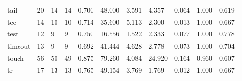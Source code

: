 \begin{longtable}{lp{1.8cm}p{1.8cm}p{1.8cm}p{1.8cm}p{1.8cm}p{1.8cm}p{1.8cm}p{1.8cm}p{1.8cm}p{1.8cm}}
tail      &                           20 &                 14 &                                14 &                                      0.700 &                                 48.000 &                                        3.591 &                             4.357 &                                   0.064 &                              1.000 &                                              0.619 \\
tee       &                           14 &                 10 &                                10 &                                      0.714 &                                 35.600 &                                        5.113 &                             2.300 &                                   0.013 &                              1.000 &                                              0.667 \\
test      &                           12 &                  9 &                                 9 &                                      0.750 &                                 16.556 &                                        1.522 &                             2.333 &                                   0.077 &                              1.000 &                                              0.778 \\
timeout   &                           13 &                  9 &                                 9 &                                      0.692 &                                 41.444 &                                        4.628 &                             2.778 &                                   0.073 &                              1.000 &                                              0.704 \\
touch     &                           56 &                 50 &                                49 &                                      0.875 &                                 79.260 &                                        4.084 &                            24.920 &                                   0.164 &                              0.960 &                                              0.607 \\
tr        &                           17 &                 13 &                                13 &                                      0.765 &                                 49.154 &                                        3.769 &                             1.769 &                                   0.012 &                              1.000 &                                              0.667 \\

\end{longtable}
